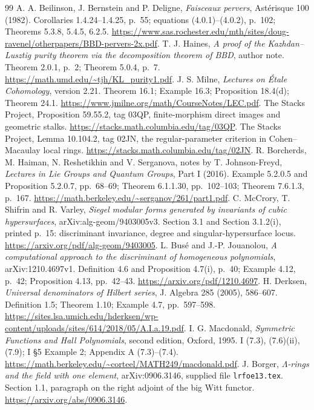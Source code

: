 \documentclass[11pt,a4paper]{article}
\begin{document}
\begin{thebibliography}{99}
 A. A. Beilinson, J. Bernstein and P. Deligne, \emph{Faisceaux pervers}, Ast\'erisque 100 (1982). Corollaries 1.4.24--1.4.25, p.~55; equations (4.0.1)--(4.0.2), p.~102; Theorems 5.3.8, 5.4.5, 6.2.5. \url{https://www.sas.rochester.edu/mth/sites/doug-ravenel/otherpapers/BBD-pervers-2x.pdf}.
 T. J. Haines, \emph{A proof of the Kazhdan--Lusztig purity theorem via the decomposition theorem of BBD}, author note. Theorem 2.0.1, p.~2; Theorem 5.0.4, p.~7. \url{https://math.umd.edu/~tjh/KL_purity1.pdf}.
 J. S. Milne, \emph{Lectures on \'Etale Cohomology}, version 2.21. Theorem 16.1; Example 16.3; Proposition 18.4(d); Theorem 24.1. \url{https://www.jmilne.org/math/CourseNotes/LEC.pdf}.
 The Stacks Project, Proposition 59.55.2, tag 03QP, finite-morphism direct images and geometric stalks. \url{https://stacks.math.columbia.edu/tag/03QP}.
 The Stacks Project, Lemma 10.104.2, tag 02JN, the regular-parameter criterion in Cohen--Macaulay local rings. \url{https://stacks.math.columbia.edu/tag/02JN}.
 R. Borcherds, M. Haiman, N. Reshetikhin and V. Serganova, notes by T. Johnson-Freyd, \emph{Lectures in Lie Groups and Quantum Groups}, Part I (2016). Example 5.2.0.5 and Proposition 5.2.0.7, pp.~68--69; Theorem 6.1.1.30, pp.~102--103; Theorem 7.6.1.3, p.~167. \url{https://math.berkeley.edu/~serganov/261/part1.pdf}.
 C. McCrory, T. Shifrin and R. Varley, \emph{Siegel modular forms generated by invariants of cubic hypersurfaces}, arXiv:alg-geom/9403005v3. Section 3.1 and Section 3.1.2(i), printed p.~15: discriminant invariance, degree and singular-hypersurface locus. \url{https://arxiv.org/pdf/alg-geom/9403005}.
 L. Bus\'e and J.-P. Jouanolou, \emph{A computational approach to the discriminant of homogeneous polynomials}, arXiv:1210.4697v1. Definition 4.6 and Proposition 4.7(i), p.~40; Example 4.12, p.~42; Proposition 4.13, pp.~42--43. \url{https://arxiv.org/pdf/1210.4697}.
 H. Derksen, \emph{Universal denominators of Hilbert series}, J. Algebra 285 (2005), 586--607. Definition 1.5; Theorem 1.10; Example 4.7, pp.~597--598. \url{https://sites.lsa.umich.edu/hderksen/wp-content/uploads/sites/614/2018/05/A.I.a.19.pdf}.
 I. G. Macdonald, \emph{Symmetric Functions and Hall Polynomials}, second edition, Oxford, 1995. I (7.3), (7.6)(ii), (7.9); I \S5 Example 2; Appendix A (7.3)--(7.4). \url{https://math.berkeley.edu/~corteel/MATH249/macdonald.pdf}.
 J. Borger, \emph{$\Lambda$-rings and the field with one element}, arXiv:0906.3146, supplied file \texttt{lrfoe13.tex}. Section 1.1, paragraph on the right adjoint of the big Witt functor. \url{https://arxiv.org/abs/0906.3146}.

\end{thebibliography}
\end{document}
